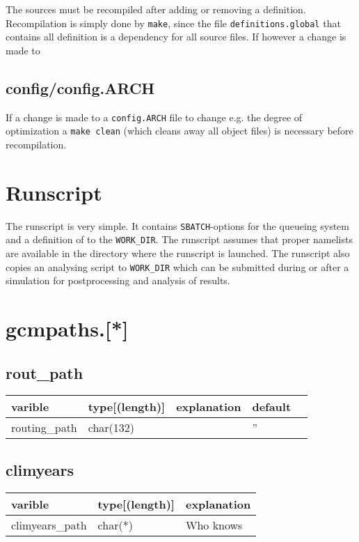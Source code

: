 \documentclass{article}
\begin{document}
The sources must be recompiled after adding or removing a
definition. Recompilation is simply done by \verb+make+, since the
file \verb+definitions.global+ that contains all definition is a
dependency for all source files. If however a change is made to

\subsection{config/config.ARCH}
\label{sec:configconf}

If a change is made to a \verb+config.ARCH+ file to change e.g. the degree of optimization a
\verb+make clean+ (which cleans away all object files) is necessary
before recompilation. 


\section{Runscript}
\label{sec:runscript}

The runscript is very simple. It contains \verb+SBATCH+-options for the queueing system and
a definition of to the \verb+WORK_DIR+. The runscript assumes that proper namelists are available
in the directory where the runscript is launched. The runscript also copies an analysing script
to \verb+WORK_DIR+ which can be submitted during or after a simulation for postprocessing and
analysis of results.

\section{gcmpaths.[*]}
\subsection{rout\_path}
\begin{tabular}{|l|l|l|l|l|}
  \hline
  varible & type[(length)] & explanation & default \\
  \hline
  \hline
  routing\_path & char(132) & & '' \\
  \hline
\end{tabular}

\subsection{climyears}
\begin{tabular}{|l|l|l|}
  \hline
  varible & type[(length)] & explanation \\
  \hline
  \hline
  climyears\_path & char(*) & Who knows \\
 \hline
\end{tabular}
\end{document}
